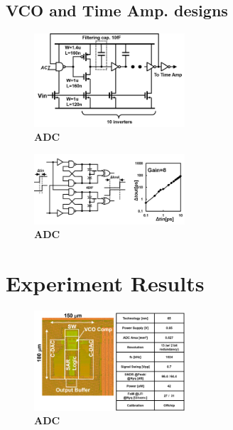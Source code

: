 \documentclass[letterpaper, 10 pt, conference]{ieeeconf}  %
\begin{document}
\subsection{VCO and Time Amp. designs}
\begin{figure}[ht!]
\centering
 \includegraphics[width=0.5\textwidth]{figs/fig6.png}
  \captionsetup{font=footnotesize}
  \caption{\textbf{ADC}}
  \label{highlight}
\end{figure}

\begin{figure}[ht!]
\centering
 \includegraphics[width=0.5\textwidth]{figs/ta_chara.png}
  \captionsetup{font=footnotesize}
  \caption{\textbf{ADC}}
  \label{highlight}
\end{figure}


\section{Experiment Results}
\begin{figure}[ht!]
\centering
 \includegraphics[width=0.5\textwidth]{figs/chipphoto.png}
  \captionsetup{font=footnotesize}
  \caption{\textbf{ADC}}
  \label{highlight}
\end{figure}
\end{document}
